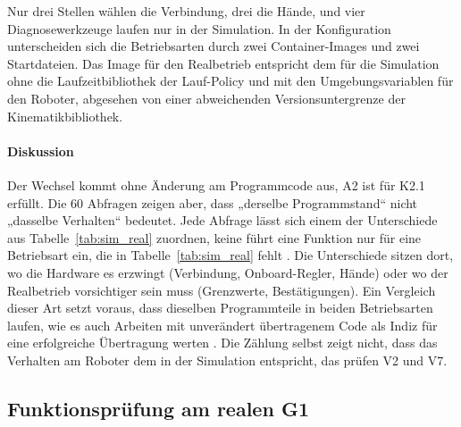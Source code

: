 Nur drei Stellen wählen die Verbindung, drei die Hände, und vier Diagnosewerkzeuge laufen nur in der Simulation.
In der Konfiguration unterscheiden sich die Betriebsarten durch zwei Container-Images und zwei Startdateien.
Das Image für den Realbetrieb entspricht dem für die Simulation ohne die Laufzeitbibliothek der Lauf-Policy und mit den Umgebungsvariablen für den Roboter, abgesehen von einer abweichenden Versionsuntergrenze der Kinematikbibliothek.

\paragraph*{Diskussion}
Der Wechsel kommt ohne Änderung am Programmcode aus, A2 ist für K2.1 erfüllt.
Die 60 Abfragen zeigen aber, dass „derselbe Programmstand“ nicht „dasselbe Verhalten“ bedeutet.
Jede Abfrage lässt sich einem der Unterschiede aus Tabelle~\ref{tab:sim_real} zuordnen, keine führt eine Funktion nur für eine Betriebsart ein, die in Tabelle~\ref{tab:sim_real} fehlt .
Die Unterschiede sitzen dort, wo die Hardware es erzwingt (Verbindung, Onboard-Regler, Hände) oder wo der Realbetrieb vorsichtiger sein muss (Grenzwerte, Bestätigungen).
Ein Vergleich dieser Art setzt voraus, dass dieselben Programmteile in beiden Betriebsarten laufen, wie es auch Arbeiten mit unverändert übertragenem Code als Indiz für eine erfolgreiche Übertragung werten \cite{Durrani2026}.
Die Zählung selbst zeigt nicht, dass das Verhalten am Roboter dem in der Simulation entspricht, das prüfen V2 und V7.

\subsection{Funktionsprüfung am realen G1}
\label{sec:eval_realtests}

